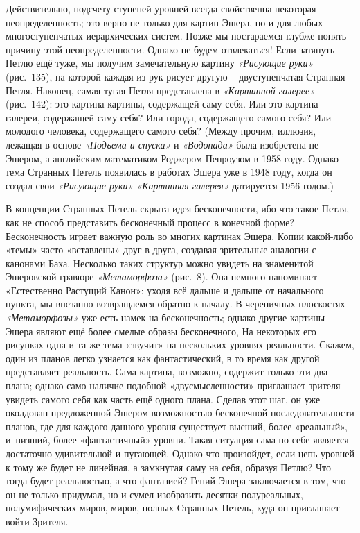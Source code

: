 \documentclass[../main.tex]{subfiles}
\begin{document}
Действительно, подсчету ступеней-уровней всегда свойственна некоторая неопределенность; это верно не только для картин Эшера, но и для любых многоступенчатых иерархических систем. Позже мы постараемся глубже понять причину этой неопределенности. Однако не будем отвлекаться! Если затянуть Петлю ещё туже, мы получим замечательную картину \emph{«Рисующие руки»} (рис.~135), на которой каждая из рук рисует другую \--- двуступенчатая Странная Петля. Наконец, самая тугая Петля представлена в \emph{«Картинной галерее»} (рис.~142): это картина картины, содержащей саму себя. Или это картина галереи, содержащей саму себя? Или города, содержащего самого себя? Или молодого человека, содержащего самого себя? (Между прочим, иллюзия, лежащая в основе \emph{«Подъема и спуска»} и \emph{«Водопада»} была изобретена не Эшером, а английским математиком Роджером Пенроузом в 1958 году. Однако тема Странных Петель появилась в работах Эшера уже в 1948 году, когда он создал свои \emph{«Рисующие руки» «Картинная галерея»} датируется 1956 годом.)

В концепции Странных Петель скрыта идея бесконечности, ибо что такое Петля, как не способ представить бесконечный процесс в конечной форме? Бесконечность играет важную роль во многих картинах Эшера. Копии какой-либо «темы» часто «вставлены» друг в друга, создавая зрительные аналогии с канонами Баха. Несколько таких структур можно увидеть на знаменитой Эшеровской гравюре \emph{«Метаморфоза»} (рис.~8). Она немного напоминает «Естественно Растущий Канон»: уходя всё дальше и дальше от начального пункта, мы внезапно возвращаемся обратно к началу. В черепичных плоскостях \emph{«Метаморфозы»} уже есть намек на бесконечность; однако другие картины Эшера являют ещё более смелые образы бесконечного, На некоторых его рисунках одна и та же тема «звучит» на нескольких уровнях реальности. Скажем, один из планов легко узнается как фантастический, в то время как другой представляет реальность. Сама картина, возможно, содержит только эти два плана; однако само наличие подобной «двусмысленности» приглашает зрителя увидеть самого себя как часть ещё одного плана. Сделав этот шаг, он уже околдован предложенной Эшером возможностью бесконечной последовательности планов, где для каждого данного уровня существует высший, более «реальный», и~низший, более «фантастичный» уровни. Такая ситуация сама по себе является достаточно удивительной и пугающей. Однако что произойдет, если цепь уровней к тому же будет не линейная, а замкнутая саму на себя, образуя Петлю? Что тогда будет реальностью, а что фантазией? Гений Эшера заключается в том, что он не только придумал, но и сумел изобразить десятки полуреальных, полумифических миров, миров, полных Странных Петель, куда он приглашает войти Зрителя.
\end{document}
